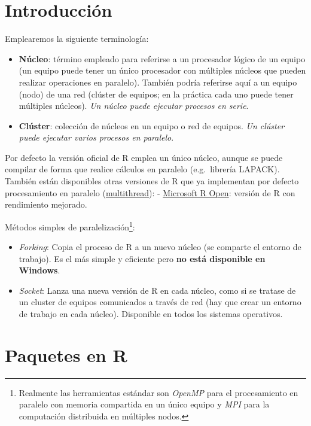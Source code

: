 \documentclass[
  spanish,
  10pt,
]{book}
\theoremstyle{break}
\theoremstyle{nonumberplain}
\let\oldfootnote\footnote
\renewcommand\footnote[1]{\oldfootnote{\hspace{2mm}#1}}
\begin{document}
\section{Introducción}\label{introducciuxf3n}

Emplearemos la siguiente terminología:

\begin{itemize}
\item
  \textbf{Núcleo}: término empleado para referirse a un procesador lógico de un equipo (un equipo puede tener un único procesador con múltiples núcleos que pueden realizar operaciones en paralelo).
  También podría referirse aquí a un equipo (nodo) de una red (clúster de equipos; en la práctica cada uno puede tener múltiples núcleos). \emph{Un núcleo puede ejecutar procesos en serie}.
\item
  \textbf{Clúster}: colección de núcleos en un equipo o red de equipos.
  \emph{Un clúster puede ejecutar varios procesos en paralelo}.
\end{itemize}

Por defecto la versión oficial de R emplea un único núcleo, aunque se puede compilar de forma que realice cálculos en paralelo (e.g.~librería LAPACK).
También están disponibles otras versiones de R que ya implementan por defecto procesamiento en paralelo (\href{https://mran.revolutionanalytics.com/documents/rro/multithread}{multithread}):
- \href{https://mran.revolutionanalytics.com}{Microsoft R Open}: versión de R con rendimiento mejorado.

Métodos simples de paralelización\footnote{Realmente las herramientas estándar son \emph{OpenMP} para el procesamiento en paralelo con memoria compartida en un único equipo y \emph{MPI} para la computación distribuida en múltiples nodos.}:

\begin{itemize}
\item
  \emph{Forking}: Copia el proceso de R a un nuevo núcleo (se comparte el entorno de trabajo).
  Es el más simple y eficiente pero \textbf{no está disponible en Windows}.
\item
  \emph{Socket}: Lanza una nueva versión de R en cada núcleo, como si se tratase de un cluster de equipos comunicados a través de red (hay que crear un entorno de trabajo en cada núcleo).
  Disponible en todos los sistemas operativos.
\end{itemize}

\section{Paquetes en R}\label{paquetes-en-r}
\end{document}
